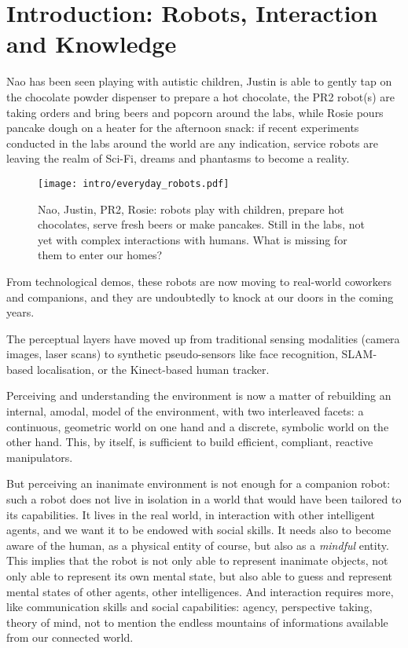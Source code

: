 \chapter{Introduction: Robots, Interaction and Knowledge}
\label{chapt|introduction}

Nao has been seen playing with autistic children, Justin is able to gently tap
on the chocolate powder dispenser to prepare a hot chocolate, the PR2 robot(s)
are taking orders and bring beers and popcorn around the labs, while Rosie
pours pancake dough on a heater for the afternoon snack: if recent experiments
conducted in the labs around the world are any indication, service robots are
leaving the realm of Sci-Fi, dreams and phantasms to become a reality.

\begin{figure}[!h]
    \centering
    \texttt{[image: intro/everyday\_robots.pdf]}

    \caption*{Nao, Justin, PR2, Rosie: robots play with children, prepare hot
    chocolates, serve fresh beers or make pancakes. Still in the labs, not
    yet with complex interactions with humans. What is missing for them to
    enter our homes?}

    \label{fig|everyday-robots}
\end{figure}

From technological demos, these robots are now moving to real-world coworkers
and companions, and they are undoubtedly to knock at our doors in the coming
years.

The perceptual layers have moved up from traditional sensing modalities (camera
images, laser scans) to synthetic pseudo-sensors like face recognition,
SLAM-based localisation, or the Kinect-based human tracker.

Perceiving and understanding the environment is now a matter of rebuilding an
internal, amodal, model of the environment, with two interleaved facets: a
continuous, geometric world on one hand and a discrete, symbolic world on the
other hand. This, by itself, is sufficient to build efficient, compliant,
reactive manipulators.

But perceiving an inanimate environment is not enough for a companion robot:
such a robot does not live in isolation in a world that would have been
tailored to its capabilities. It lives in the real world, in interaction with
other intelligent agents, and we want it to be endowed with social skills. It
needs also to become aware of the human, as a physical entity of course, but
also as a \emph{mindful} entity. This implies that the robot is not only able
to represent inanimate objects, not only able to represent its own mental
state, but also able to guess and represent mental states of other agents,
other intelligences. And interaction requires more, like communication skills
and social capabilities: agency, perspective taking, theory of mind, not to
mention the endless mountains of informations available from our connected
world.

